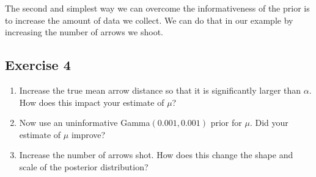 The second and simplest way we can overcome the informativeness of the prior is to increase the amount of data we collect.
We can do that in our example by increasing the number of arrows we shoot.

\subsection{Exercise 4}

\begin{enumerate}[label=\textnormal{Step \arabic*)},leftmargin=1.5cm]
	\item Increase the true mean arrow distance so that it is significantly larger than $\alpha$. How does this impact your estimate of $\mu$?
	\item Now use an uninformative Gamma$(0.001, 0.001)$ prior for $\mu$. Did your estimate of $\mu$ improve?
	\item Increase the number of arrows shot. How does this change the shape and scale of the posterior distribution?
\end{enumerate}



